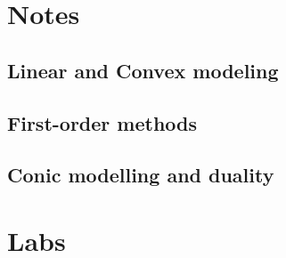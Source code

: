 






\tableofcontents
\newpage
{}

\part{Notes}

\chapter{Linear and Convex modeling}	
\label{Ch1}
	





	
\chapter{First-order methods}
\label{Ch2}

	

	

	
	
\chapter{Conic modelling and duality}

	

	

	

	
	
	
	
	

\part{Labs}



	
	







